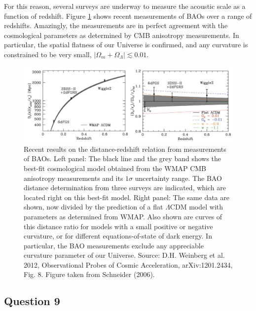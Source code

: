 \documentclass[a4paper,11pt]{article}
\begin{document}
{\noindent}For this reason, several surveys are underway to measure the acoustic scale as a function of redshift. Figure \ref{fig:BAOs} shows recent measurements of BAOs over a range of redshifts. Amazingly, the measurements are in perfect agreement with the cosmological parameters as determined by CMB anisotropy measurements. In particular, the spatial flatness of our Universe is confirmed, and any curvature is constrained to be very small, $\lvert\Omega_m+\Omega_\Lambda\rvert\lesssim0.01$.

\begin{figure}[t]
    \includegraphics[width=16cm]{figures/BAOs.png}
    \centering
    \caption{\footnotesize{Recent results on the distance-redshift relation from measurements of BAOs. Left panel: The black line and the grey band shows the best-fit cosmological model obtained from the WMAP CMB anisotropy measurements and its $1\sigma$  uncertainty range. The BAO distance determination from three surveys are indicated, which are located right on this best-fit model. Right panel: The same data are shown, now divided by the prediction of a flat $\Lambda$CDM model with parameters as determined from WMAP. Also shown are curves of this distance ratio for models with a small positive or negative curvature, or for different equations-of-state of dark energy. In particular, the BAO measurements exclude any appreciable curvature parameter of our Universe. Source: D.H. Weinberg et al. 2012, Observational Probes of Cosmic Acceleration, arXiv:1201.2434, Fig. 8. Figure taken from Schneider (2006).}}
    \label{fig:BAOs}
\end{figure}

%
%

\newpage
\subsection{Question 9}
\end{document}
